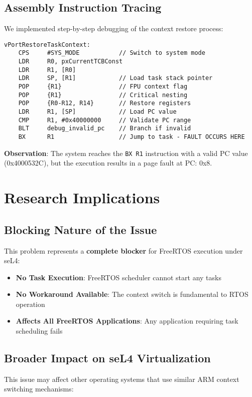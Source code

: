 \documentclass[11pt]{article}
\begin{document}
\subsection{Assembly Instruction Tracing}
We implemented step-by-step debugging of the context restore process:

\begin{lstlisting}[caption=Custom Context Restore Debug (ARM Assembly)]
vPortRestoreTaskContext:
    CPS     #SYS_MODE           // Switch to system mode
    LDR     R0, pxCurrentTCBConst
    LDR     R1, [R0]
    LDR     SP, [R1]            // Load task stack pointer
    POP     {R1}                // FPU context flag
    POP     {R1}                // Critical nesting
    POP     {R0-R12, R14}       // Restore registers
    LDR     R1, [SP]            // Load PC value
    CMP     R1, #0x40000000     // Validate PC range
    BLT     debug_invalid_pc    // Branch if invalid
    BX      R1                  // Jump to task - FAULT OCCURS HERE
\end{lstlisting}

\textbf{Observation}: The system reaches the \texttt{BX R1} instruction with a valid PC value (0x4000532C), but the execution results in a page fault at PC: 0x8.

\section{Research Implications}

\subsection{Blocking Nature of the Issue}
This problem represents a \textbf{complete blocker} for FreeRTOS execution under seL4:

\begin{itemize}
    \item \textbf{No Task Execution}: FreeRTOS scheduler cannot start any tasks
    \item \textbf{No Workaround Available}: The context switch is fundamental to RTOS operation
    \item \textbf{Affects All FreeRTOS Applications}: Any application requiring task scheduling fails
\end{itemize}

\subsection{Broader Impact on seL4 Virtualization}
This issue may affect other operating systems that use similar ARM context switching mechanisms:
\end{document}
